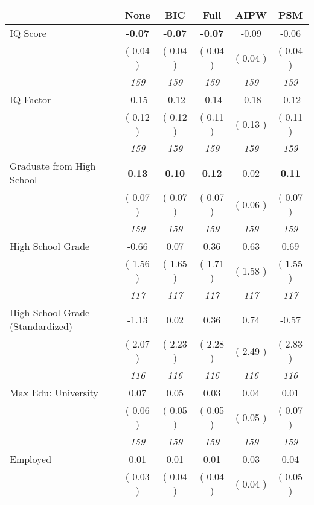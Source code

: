 \begin{tabular}{l c c c c c}
\toprule
 & None & BIC & Full & AIPW & PSM \\
\midrule
IQ Score & \textbf{     -0.07 } & \textbf{     -0.07 } & \textbf{     -0.07 } &     -0.09 &     -0.06 \\
& (     0.04 ) & (     0.04 ) & (     0.04 ) & (     0.04 ) & (     0.04 ) \\
& \textit{ 159 } & \textit{ 159 } & \textit{ 159 } & \textit{ 159 } & \textit{ 159 } \\
IQ Factor &     -0.15 &     -0.12 &     -0.14 &     -0.18 &     -0.12 \\
& (     0.12 ) & (     0.12 ) & (     0.11 ) & (     0.13 ) & (     0.11 ) \\
& \textit{ 159 } & \textit{ 159 } & \textit{ 159 } & \textit{ 159 } & \textit{ 159 } \\
Graduate from High School & \textbf{      0.13 } & \textbf{      0.10 } & \textbf{      0.12 } &      0.02 & \textbf{     0.11} \\
& (     0.07 ) & (     0.07 ) & (     0.07 ) & (     0.06 ) & (     0.07 ) \\
& \textit{ 159 } & \textit{ 159 } & \textit{ 159 } & \textit{ 159 } & \textit{ 159 } \\
High School Grade &     -0.66 &      0.07 &      0.36 &      0.63 &      0.69 \\
& (     1.56 ) & (     1.65 ) & (     1.71 ) & (     1.58 ) & (     1.55 ) \\
& \textit{ 117 } & \textit{ 117 } & \textit{ 117 } & \textit{ 117 } & \textit{ 117 } \\
High School Grade (Standardized) &     -1.13 &      0.02 &      0.36 &      0.74 &     -0.57 \\
& (     2.07 ) & (     2.23 ) & (     2.28 ) & (     2.49 ) & (     2.83 ) \\
& \textit{ 116 } & \textit{ 116 } & \textit{ 116 } & \textit{ 116 } & \textit{ 116 } \\
Max Edu: University &      0.07 &      0.05 &      0.03 &      0.04 &      0.01 \\
& (     0.06 ) & (     0.05 ) & (     0.05 ) & (     0.05 ) & (     0.07 ) \\
& \textit{ 159 } & \textit{ 159 } & \textit{ 159 } & \textit{ 159 } & \textit{ 159 } \\
Employed &      0.01 &      0.01 &      0.01 &      0.03 &      0.04 \\
& (     0.03 ) & (     0.04 ) & (     0.04 ) & (     0.04 ) & (     0.05 ) \\

\end{tabular}
